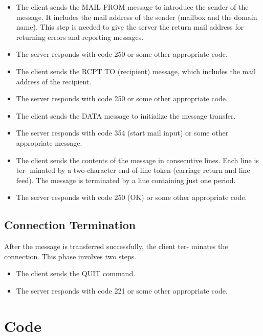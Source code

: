 \documentclass[a4paper,12pt]{article}
\begin{document}
\begin{itemize}
    \item The client sends the MAIL FROM message to introduce the sender of the 
    message. It includes the mail address of the sender (mailbox and the domain 
    name). This step is needed to give the server the return mail address for 
    returning errors and reporting messages.

    \item The server responds with code 250 or some other appropriate code.

    \item The client sends the RCPT TO (recipient) message, which includes the mail address
    of the recipient.

    \item The server responds with code 250 or some other appropriate code.

    \item The client sends the DATA message to initialize the message transfer.

    \item The server responds with code 354 (start mail input) or some other appropriate
    message.

    \item The client sends the contents of the message in consecutive lines. 
    Each line is ter- minated by a two-character end-of-line token 
    (carriage return and line feed). The message is terminated by a line 
    containing just one period.

    \item The server responds with code 250 (OK) or some other appropriate code.

\end{itemize}

\subsection{Connection Termination}
After the message is transferred successfully, the client ter- minates the connection. 
This phase involves two steps.
\begin{itemize}
    \item The client sends the QUIT command.
    \item The server responds with code 221 or some other appropriate code.
\end{itemize}

\section{Code}
\end{document}
